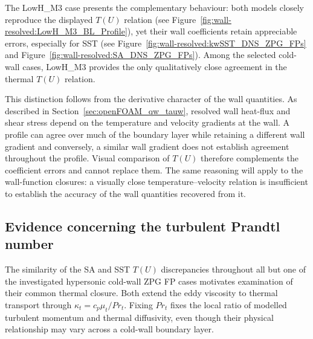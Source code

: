 The LowH\_M3 case presents the complementary behaviour: both models closely reproduce the displayed \(T(U)\) relation (see Figure~\ref{fig:wall-resolved:LowH_M3_BL_Profile}), yet their wall coefficients retain appreciable errors, especially for SST (see Figure~\ref{fig:wall-resolved:kwSST_DNS_ZPG_FPs} and Figure~\ref{fig:wall-resolved:SA_DNS_ZPG_FPs}). Among the selected cold-wall cases, LowH\_M3 provides the only qualitatively close agreement in the thermal \(T(U)\) relation.
\par\medskip

This distinction follows from the derivative character of the wall quantities. As described in Section~\ref{sec:openFOAM_qw_tauw}, resolved wall heat-flux and shear stress depend on the temperature and velocity gradients at the wall. A profile can agree over much of the boundary layer while retaining a different wall gradient and conversely, a similar wall gradient does not establish agreement throughout the profile. Visual comparison of \(T(U)\) therefore complements the coefficient errors and cannot replace them. The same reasoning will apply to the wall-function closures: a visually close temperature--velocity relation is insufficient to establish the accuracy of the wall quantities recovered from it.

\subsection{Evidence concerning the turbulent Prandtl number}
\label{subsec:comparative:zpg:wr-prandtl}

The similarity of the SA and SST \(T(U)\) discrepancies throughout all but one of the investigated hypersonic cold-wall ZPG FP cases motivates examination of their common thermal closure. Both extend the eddy viscosity to thermal transport through \(\kappa_t=c_p\mu_t/Pr_t\). Fixing \(Pr_t\) fixes the local ratio of modelled turbulent momentum and thermal diffusivity, even though their physical relationship may vary across a cold-wall boundary layer.
\par\medskip

